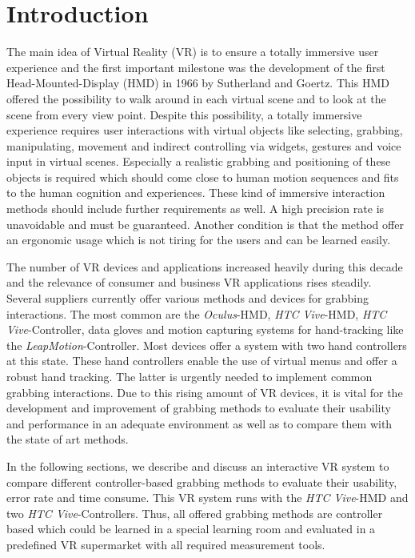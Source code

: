 \section{Introduction}\label{sec:Introduction}

The main idea of Virtual Reality (VR) is to ensure a totally immersive user experience and the first important milestone was the development of the first Head-Mounted-Display (HMD) in 1966 by Sutherland and Goertz. This HMD offered the possibility to walk around in each virtual scene and to look at the scene from every view point. Despite this possibility, a totally immersive experience requires user interactions with virtual objects like selecting, grabbing, manipulating, movement and indirect controlling via widgets, gestures and voice input in virtual scenes. Especially a realistic grabbing and positioning of these objects is required which should come close to human motion sequences and fits to the human cognition and experiences. These kind of immersive interaction methods should include further requirements as well. A high precision rate is unavoidable and must be guaranteed. Another condition is that the method offer an ergonomic usage which is not  tiring for the users and can be learned easily.  

The number of VR devices and applications increased heavily during this decade and the relevance of consumer and business VR applications rises steadily. Several suppliers currently offer various methods and devices for grabbing interactions. The most common are the \textit{Oculus}-HMD, \textit{HTC Vive}-HMD, \textit{HTC Vive}-Controller, data gloves and motion capturing systems for hand-tracking like the \textit{LeapMotion}-Controller. Most devices offer a system with two hand controllers at this state. These hand controllers enable the use of virtual menus and offer a robust hand tracking. The latter is urgently needed to implement common grabbing interactions. Due to this rising amount of VR devices, it is vital for the development and improvement of grabbing methods to evaluate their usability and performance in an adequate environment as well as to compare them with the state of art methods. 

In the following sections, we describe and discuss an interactive VR system to compare different controller-based grabbing methods to evaluate their usability, error rate and time consume. This VR system runs with the \textit{HTC Vive}-HMD and two \textit{HTC Vive}-Controllers. Thus, all offered grabbing methods are controller based which could be learned in a special learning room and evaluated in a predefined VR supermarket with all required measurement tools.

